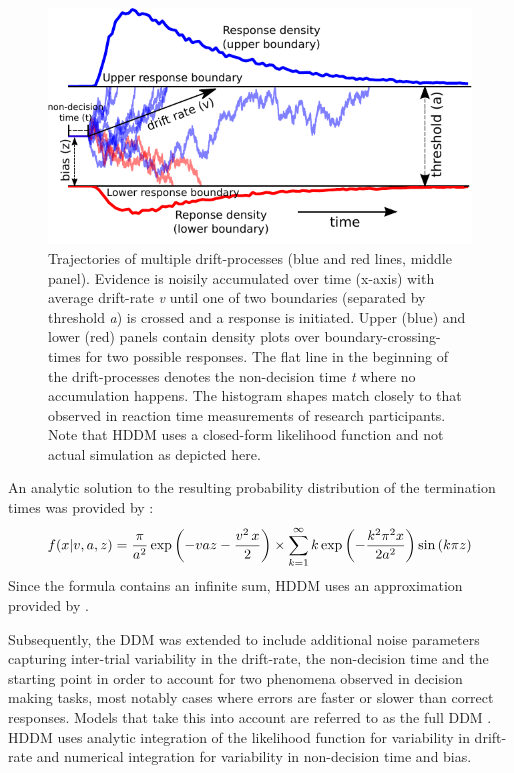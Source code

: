 \documentclass[letterpaper,10pt,english]{article}
\begin{document}
\begin{figure}
\centering
\capstart

\includegraphics{DDM.pdf}
\caption{Trajectories of multiple drift-processes (blue and red lines, middle panel). Evidence is noisily accumulated over time (x-axis) with average drift-rate \textit{v} until one of two boundaries (separated by threshold \textit{a}) is crossed and a response is initiated. Upper (blue) and lower (red) panels contain density plots over boundary-crossing-times for two possible responses. The flat line in the beginning of the drift-processes denotes the non-decision time \textit{t} where no accumulation happens. The histogram shapes match closely to that observed in reaction time measurements of research participants. Note that HDDM uses a closed-form likelihood function and not actual simulation as depicted here.}
\label{fig.ddm}
\end{figure}

An analytic solution to the resulting probability distribution of
the termination times was provided by \citep{Feller68}:
\begin{gather}
\begin{split}f(x|v, a, z) = \frac{\pi}{a^2} \, \text{exp} \left( -vaz-\frac{v^2\,x}{2} \right) \times \sum_{k=1}^{\infty} k\, \text{exp} \left( -\frac{k^2\pi^2 x}{2a^2} \right) \text{sin}\left(k\pi z\right)\end{split}\notag
\end{gather}
Since the formula contains an infinite sum, HDDM uses an approximation
provided by \citep{NavarroFuss09}.

Subsequently, the DDM was extended to include additional noise parameters capturing inter-trial variability in the drift-rate, the non-decision time and the starting point in order to account for two phenomena observed in decision making tasks, most notably cases where errors are faster or slower than correct responses. Models that take this into account are referred to as the full DDM \citep{RatcliffRouder98}. HDDM uses analytic integration of the likelihood function for variability in drift-rate and numerical integration for variability in non-decision time and bias.
\end{document}
